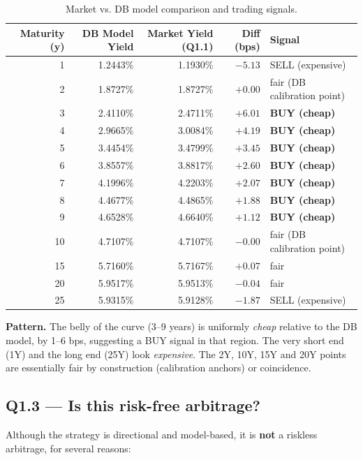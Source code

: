 \documentclass[11pt]{article}
\newcommand{\question}[1]{\subsection*{\textcolor{edhecred}{#1}}}
\begin{document}
\begin{table}[h]
\centering
\small
\begin{tabular}{rrrrl}
\toprule
Maturity (y) & DB Model Yield & Market Yield (Q1.1) & Diff (bps) & Signal \\
\midrule
1  & 1.2443\% & 1.1930\% & $-5.13$ & SELL (expensive) \\
2  & 1.8727\% & 1.8727\% & $+0.00$ & fair (DB calibration point) \\
3  & 2.4110\% & 2.4711\% & $+6.01$ & \textbf{BUY (cheap)} \\
4  & 2.9665\% & 3.0084\% & $+4.19$ & \textbf{BUY (cheap)} \\
5  & 3.4454\% & 3.4799\% & $+3.45$ & \textbf{BUY (cheap)} \\
6  & 3.8557\% & 3.8817\% & $+2.60$ & \textbf{BUY (cheap)} \\
7  & 4.1996\% & 4.2203\% & $+2.07$ & \textbf{BUY (cheap)} \\
8  & 4.4677\% & 4.4865\% & $+1.88$ & \textbf{BUY (cheap)} \\
9  & 4.6528\% & 4.6640\% & $+1.12$ & \textbf{BUY (cheap)} \\
10 & 4.7107\% & 4.7107\% & $-0.00$ & fair (DB calibration point) \\
15 & 5.7160\% & 5.7167\% & $+0.07$ & fair \\
20 & 5.9517\% & 5.9513\% & $-0.04$ & fair \\
25 & 5.9315\% & 5.9128\% & $-1.87$ & SELL (expensive) \\
\bottomrule
\end{tabular}
\caption{Market vs. DB model comparison and trading signals.}
\end{table}

\textbf{Pattern.} The belly of the curve (3--9 years) is uniformly
\emph{cheap} relative to the DB model, by 1--6 bps, suggesting a BUY
signal in that region. The very short end (1Y) and the long end
(25Y) look \emph{expensive}. The 2Y, 10Y, 15Y and 20Y points are essentially fair
by construction (calibration anchors) or coincidence.

\question{Q1.3 --- Is this risk-free arbitrage?}

Although the strategy is directional and model-based, it is \textbf{not}
a riskless arbitrage, for several reasons:
\end{document}
